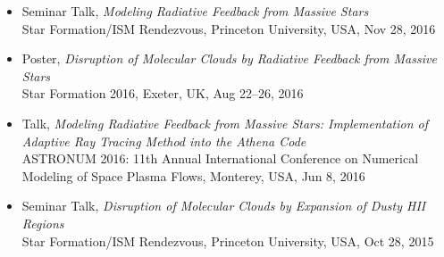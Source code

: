 \documentclass[11pt,letterpaper,roman]{moderncv}        %
\begin{document}
\begin{itemize}
{    Radiation Feedback from Massive Stars}\\ 2017 Korean Astronomical
  Society Spring Meeting, Seoul, Korea, Apr 13, 2017
\item Seminar Talk, \textit{Modeling Radiative Feedback from Massive
    Stars}\\ Star Formation/ISM Rendezvous, Princeton University, USA,
  Nov 28, 2016
\item Poster, \textit{Disruption of Molecular Clouds by Radiative
    Feedback from Massive Stars}\\ Star Formation 2016, Exeter, UK, Aug
  22--26, 2016
\item Talk, \textit{Modeling Radiative Feedback from Massive Stars:
    Implementation of Adaptive Ray Tracing Method into the Athena
    Code}\\ ASTRONUM 2016: 11th Annual International Conference on
  Numerical Modeling of Space Plasma Flows, Monterey, USA, Jun 8, 2016
\item Seminar Talk, \textit{Disruption of Molecular Clouds by
    Expansion of Dusty HII Regions}\\ Star Formation/ISM Rendezvous,
  Princeton University, USA, Oct 28, 2015

\end{itemize}
\end{document}
